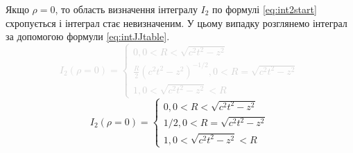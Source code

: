Якщо $ \rho = 0 $, то область визначення інтегралу $ I_2 $ по формулі 
\eqref{eq:int2start} схропується і інтеграл стає невизначеним. У цьому випадку 
розглянемо інтеграл за допомогою формули \eqref{eq:intJJtable}.
%
\textcolor{lightgray}{ \begin{equation*}
I_2 \left( \rho = 0 \right) = \begin{cases}
0, 0 < R < \sqrt{c^2t^2 - z^2} \\
\frac{R}{2} \left( c^2t^2 - z^2 \right)^{-1/2}, 0 < R = \sqrt{c^2t^2 - z^2} \\ 
1, 0 < \sqrt{c^2t^2 - z^2} < R 
\end{cases}
\end{equation*} }
%
\begin{equation}
I_2 \left( \rho = 0 \right) = \begin{cases}
0, 0 < R < \sqrt{c^2t^2 - z^2} \\
1/2, 0 < R = \sqrt{c^2t^2 - z^2} \\ 
1, 0 < \sqrt{c^2t^2 - z^2} < R 
\end{cases}
\end{equation}
